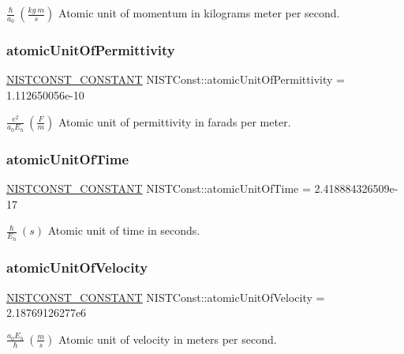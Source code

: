 $\frac{\hbar}{a_0} \ (\frac{kg\ m}{s})$ Atomic unit of momentum in kilograms meter per second. \mbox{\label{group___n_i_s_t_const-_atomic_unit_ga150ae2f35ef916113c6bcf612b7fa8c8}} 
\subsubsection{\texorpdfstring{atomic\+Unit\+Of\+Permittivity}{atomicUnitOfPermittivity}}
{\footnotesize\ttfamily \mbox{\hyperlink{_n_i_s_t_const_8hpp_a2b0fc1d7452373f816175dd86ce26729}{N\+I\+S\+T\+C\+O\+N\+S\+T\+\_\+\+C\+O\+N\+S\+T\+A\+NT}} N\+I\+S\+T\+Const\+::atomic\+Unit\+Of\+Permittivity = 1.\+112650056e-\/10}

$\frac{e^2}{a_0 E_h} \ (\frac{F}{m})$ Atomic unit of permittivity in farads per meter. \mbox{\label{group___n_i_s_t_const-_atomic_unit_ga1dd9cd3a8f95c754529e663dc03d7b9e}} 
\subsubsection{\texorpdfstring{atomic\+Unit\+Of\+Time}{atomicUnitOfTime}}
{\footnotesize\ttfamily \mbox{\hyperlink{_n_i_s_t_const_8hpp_a2b0fc1d7452373f816175dd86ce26729}{N\+I\+S\+T\+C\+O\+N\+S\+T\+\_\+\+C\+O\+N\+S\+T\+A\+NT}} N\+I\+S\+T\+Const\+::atomic\+Unit\+Of\+Time = 2.\+418884326509e-\/17}

$\frac{\hbar}{E_h} \ (s)$ Atomic unit of time in seconds. \mbox{\label{group___n_i_s_t_const-_atomic_unit_gaf53a1d1a7382eb03e12e980aeb34ded4}} 
\subsubsection{\texorpdfstring{atomic\+Unit\+Of\+Velocity}{atomicUnitOfVelocity}}
{\footnotesize\ttfamily \mbox{\hyperlink{_n_i_s_t_const_8hpp_a2b0fc1d7452373f816175dd86ce26729}{N\+I\+S\+T\+C\+O\+N\+S\+T\+\_\+\+C\+O\+N\+S\+T\+A\+NT}} N\+I\+S\+T\+Const\+::atomic\+Unit\+Of\+Velocity = 2.\+18769126277e6}

$\frac{a_0 E_h}{\hbar} \ (\frac{m}{s})$ Atomic unit of velocity in meters per second. 
